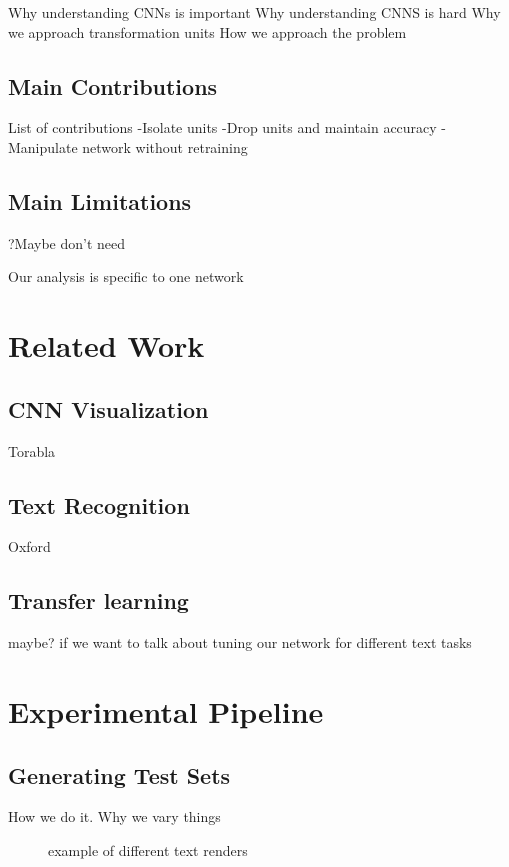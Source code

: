 \documentclass[10pt,twocolumn,letterpaper]{article}
\begin{document}
Why understanding CNNs is important
Why understanding CNNS is hard
Why we approach transformation units
How we approach the problem


\subsection{Main Contributions}

List of contributions
-Isolate units
-Drop units and maintain accuracy
-Manipulate network without retraining

\subsection{Main Limitations}

?Maybe don't need

Our analysis is specific to one network

\section{Related Work}


\subsection{CNN Visualization}

Torabla

\subsection{Text Recognition}

Oxford

\subsection{Transfer learning}

maybe? if we want to talk about tuning our network for different text tasks

\section{Experimental Pipeline}
\subsection{Generating Test Sets}
How we do it. Why we vary things

\begin{figure}
\caption{example of different text renders}
\label{fig:text}
\end{figure}
\end{document}
